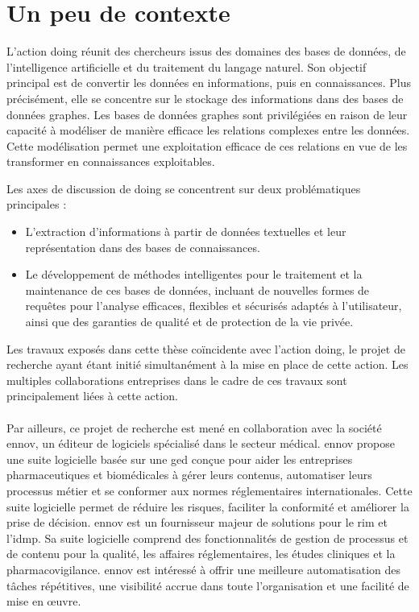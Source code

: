 \section{Un peu de contexte}

L'action \gls{doing} réunit des chercheurs issus des domaines des bases de données, de l'intelligence artificielle et du traitement du langage naturel.
Son objectif principal est de convertir les données en informations, puis en connaissances.
Plus précisément, elle se concentre sur le stockage des informations dans des bases de données graphes.
Les bases de données graphes sont privilégiées en raison de leur capacité à modéliser de manière efficace les relations complexes entre les données.
Cette modélisation permet une exploitation efficace de ces relations en vue de les transformer en connaissances exploitables.

Les axes de discussion de \gls{doing} se concentrent sur deux problématiques principales :
\begin{itemize}
    \item L'extraction d'informations à partir de données textuelles et leur représentation dans des bases de connaissances.
    \item Le développement de méthodes intelligentes pour le traitement et la maintenance de ces bases de données, incluant de nouvelles formes de requêtes pour l'analyse efficaces, flexibles et sécurisés adaptés à l'utilisateur, ainsi que des garanties de qualité et de protection de la vie privée.
\end{itemize}

Les travaux exposés dans cette thèse coïncidente avec l'action \gls{doing}, le projet de recherche ayant étant initié simultanément à la mise en place de cette action.
Les multiples collaborations entreprises dans le cadre de ces travaux sont principalement liées à cette action.

\paragraph{}
Par ailleurs, ce projet de recherche est mené en collaboration avec la société \gls{ennov}, un éditeur de logiciels spécialisé dans le secteur médical.
\gls{ennov} propose une suite logicielle basée sur une \gls{ged} conçue pour aider les entreprises pharmaceutiques et biomédicales à gérer leurs contenus, automatiser leurs processus métier et se conformer aux normes réglementaires internationales.
Cette suite logicielle permet de réduire les risques, faciliter la conformité et améliorer la prise de décision.
\gls{ennov} est un fournisseur majeur de solutions pour le \gls{rim} et l'\gls{idmp}.
Sa suite logicielle comprend des fonctionnalités de gestion de processus et de contenu pour la qualité, les affaires réglementaires, les études cliniques et la pharmacovigilance.
\gls{ennov} est intéressé à offrir une meilleure automatisation des tâches répétitives, une visibilité accrue dans toute l'organisation et une facilité de mise en œuvre.

